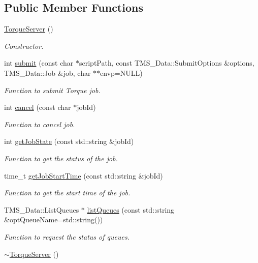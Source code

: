 \subsection*{Public Member Functions}
\begin{DoxyCompactItemize}
\item 
\hypertarget{classTorqueServer_a1537f6573e0996608ea317264ecb02e9}{
\hyperlink{classTorqueServer_a1537f6573e0996608ea317264ecb02e9}{TorqueServer} ()}
\label{classTorqueServer_a1537f6573e0996608ea317264ecb02e9}

\begin{DoxyCompactList}\small\item\em Constructor. \item\end{DoxyCompactList}\item 
int \hyperlink{classTorqueServer_aed03b8755d1959b3a2218abbf4c15b45}{submit} (const char $\ast$scriptPath, const TMS\_\-Data::SubmitOptions \&options, TMS\_\-Data::Job \&job, char $\ast$$\ast$envp=NULL)
\begin{DoxyCompactList}\small\item\em Function to submit Torque job. \item\end{DoxyCompactList}\item 
int \hyperlink{classTorqueServer_a18f3c5c500957a5a14f64f3c34252ae5}{cancel} (const char $\ast$jobId)
\begin{DoxyCompactList}\small\item\em Function to cancel job. \item\end{DoxyCompactList}\item 
int \hyperlink{classTorqueServer_ab86efdba2c40900e858ebf9f687ad05b}{getJobState} (const std::string \&jobId)
\begin{DoxyCompactList}\small\item\em Function to get the status of the job. \item\end{DoxyCompactList}\item 
time\_\-t \hyperlink{classTorqueServer_accebe9545525e72a67d3c684665c9264}{getJobStartTime} (const std::string \&jobId)
\begin{DoxyCompactList}\small\item\em Function to get the start time of the job. \item\end{DoxyCompactList}\item 
TMS\_\-Data::ListQueues $\ast$ \hyperlink{classTorqueServer_a63240dcd85082bb88ee157a8da8f6a04}{listQueues} (const std::string \&optQueueName=std::string())
\begin{DoxyCompactList}\small\item\em Function to request the status of queues. \item\end{DoxyCompactList}\item 
\hypertarget{classTorqueServer_a1f6d05661fd240d68e0ef7bf92f54092}{
\hyperlink{classTorqueServer_a1f6d05661fd240d68e0ef7bf92f54092}{$\sim$TorqueServer} ()}
\label{classTorqueServer_a1f6d05661fd240d68e0ef7bf92f54092}


\end{DoxyCompactItemize}
